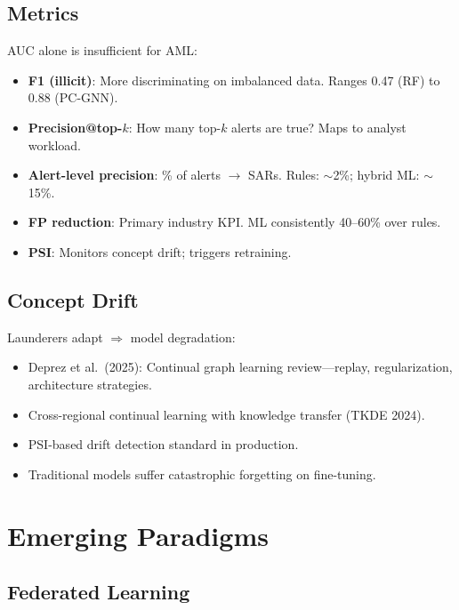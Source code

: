 \documentclass[11pt]{article}
\begin{document}
\subsection{Metrics}

AUC alone is insufficient for AML:
\begin{itemize}
\item \textbf{F1 (illicit)}: More discriminating on imbalanced data. Ranges 0.47 (RF) to 0.88 (PC-GNN).
\item \textbf{Precision@top-$k$}: How many top-$k$ alerts are true? Maps to analyst workload.
\item \textbf{Alert-level precision}: \% of alerts $\to$ SARs. Rules: $\sim$2\%; hybrid ML: $\sim$15\%.
\item \textbf{FP reduction}: Primary industry KPI. ML consistently 40--60\% over rules.
\item \textbf{PSI}: Monitors concept drift; triggers retraining.
\end{itemize}

\subsection{Concept Drift}

Launderers adapt $\Rightarrow$ model degradation:
\begin{itemize}
\item Deprez et al.\ (2025): Continual graph learning review---replay, regularization, architecture strategies.
\item Cross-regional continual learning with knowledge transfer (TKDE 2024).
\item PSI-based drift detection standard in production.
\item Traditional models suffer catastrophic forgetting on fine-tuning.
\end{itemize}

\section{Emerging Paradigms}

\subsection{Federated Learning}
\end{document}
